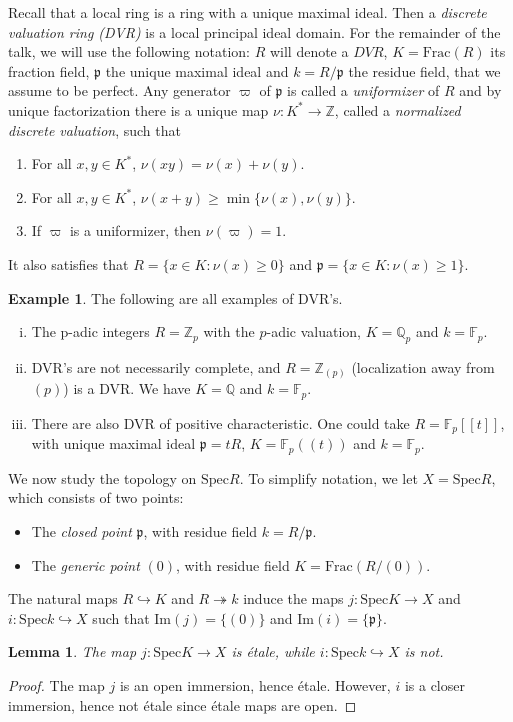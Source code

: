 \documentclass{article}
\newcommand{\Spec}{\mathrm{Spec}}
\newcommand{\Frac}{\mathrm{Frac}}
\newcommand{\F}{\mathbb{F}}
\newcommand{\Q}{\mathbb{Q}}
\newcommand{\Z}{\mathbb{Z}}
\newcommand{\pp}{\mathfrak{p}}
\theoremstyle{plain}
\newtheorem{lemma}[theorem]{Lemma}
\theoremstyle{definition}
\newtheorem{example}[theorem]{Example}
\begin{document}
    Recall that a local ring is a ring with a unique maximal ideal. Then a \textit{discrete valuation ring (DVR)} is a local principal ideal domain. For the remainder of the talk, we will use the following notation: $R$ will denote a $DVR$, $K=\mathrm{Frac}(R)$ its fraction field, $\pp$ the unique maximal ideal and $k=R/\pp$ the residue field, that we assume to be perfect. Any generator $\varpi$ of $\pp$ is called a \textit{uniformizer} of $R$ and by unique factorization there is a unique map $\nu:K^*\to\Z$, called a \textit{normalized discrete valuation}, such that 
    \begin{enumerate}[(1)]
        \item For all $x,y\in K^*$, $\nu(xy)=\nu(x)+\nu(y)$.
        \item For all $x,y\in K^*$, $\nu(x+y)\geq\min\{\nu(x),\nu(y)\}$.
        \item If $\varpi$ is a uniformizer, then $\nu(\varpi)=1$.
    \end{enumerate}
    It also satisfies that $R=\{x\in K:\nu(x)\geq 0\}$ and $\pp=\{x\in K:\nu(x)\geq 1\}$. 
    \begin{example}
        The following are all examples of DVR's.
        \begin{enumerate}[(i)]
            \item The p-adic integers $R=\Z_p$ with the $p$-adic valuation, $K=\Q_p$ and $k=\F_p$.
            \item DVR's are not necessarily complete, and $R=\Z_{(p)}$ (localization away from $(p)$) is a DVR. We have $K=\Q$ and $k=\F_p$.
            \item There are also DVR of positive characteristic. One could take $R=\F_p[[t]]$, with unique maximal ideal $\mathfrak{p}=tR$, $K=\F_p((t))$ and $k=\F_p$.
        \end{enumerate}
    \end{example}

    We now study the topology on $\Spec R$. To simplify notation, we let $X=\Spec R$, which consists of two points:
    \begin{itemize}
        \item The \textit{closed point} $\pp$, with residue field $k=R/\pp$.
        \item The \textit{generic point} $(0)$, with residue field $K=\Frac(R/(0))$.
    \end{itemize}
    The natural maps $R\hookrightarrow K$ and $R\twoheadrightarrow k$ induce the maps $j:\Spec K\to X$ and $i:\Spec k\hookrightarrow X$ such that $\mathrm{Im}(j)=\{(0)\}$ and $\mathrm{Im}(i)=\{\pp\}$.
    \begin{lemma}
        The map $j:\Spec K\to X$ is \'{e}tale, while $i:\Spec k\hookrightarrow X$ is not.
    \end{lemma}
    \begin{proof}
        The map $j$ is an open immersion, hence \'{e}tale. However, $i$ is a closer immersion, hence not \'{e}tale since \'{e}tale maps are open.
    \end{proof}
\end{document}
